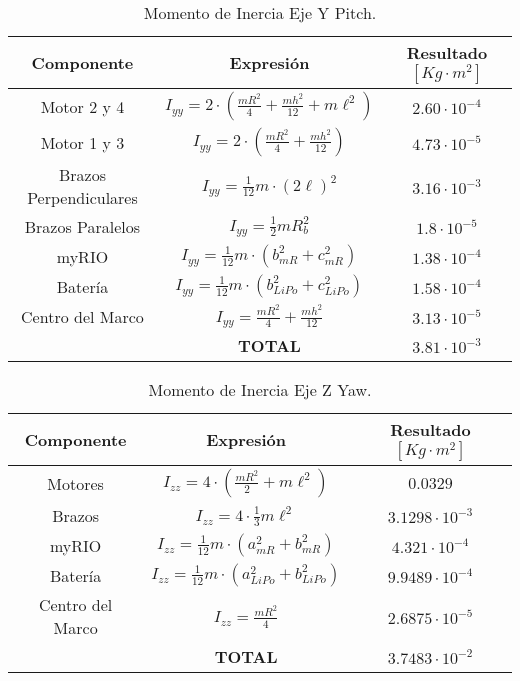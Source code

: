 \documentclass[../main.tex]{subfiles}
\begin{document}
\begin{table}[H]
\noindent \begin{centering}
\begin{tabular}{|c|c|c|}
\hline 
\textbf{Componente } & \textbf{Expresión} & \textbf{Resultado $[Kg\cdot m^2]$}\tabularnewline
\hline 
\hline 
Motor 2 y 4 & $I_{yy}=2\cdot(\frac{mR^{2}}{4}+\frac{mh^{2}}{12}+m\ell^{2})$ & $2.60\cdot10^{-4}$\tabularnewline
\hline 
Motor 1 y 3 & $I_{yy}=2\cdot(\frac{mR^{2}}{4}+\frac{mh^{2}}{12})$ & $4.73\cdot10^{-5}$\tabularnewline
\hline 
Brazos Perpendiculares & $I_{yy}=\frac{1}{12}m\cdot(2\ell)^{2}$ & $3.16\cdot10^{-3}$\tabularnewline
\hline 
Brazos Paralelos & $I_{yy}=\frac{1}{2}mR_{b}^{2}$ & $1.8\cdot10^{-5}$\tabularnewline
\hline 
myRIO & $I_{yy}=\frac{1}{12}m\cdot(b_{mR}^{2}+c_{mR}^{2})$ & $1.38\cdot10^{-4}$\tabularnewline
\hline 
Batería & $I_{yy}=\frac{1}{12}m\cdot(b_{LiPo}^{2}+c_{LiPo}^{2})$ & $1.58\cdot10^{-4}$\tabularnewline
\hline 
Centro del Marco & $I_{yy}=\frac{mR^{2}}{4}+\frac{mh^{2}}{12}$ & $3.13\cdot10^{-5}$\tabularnewline
\hline 
\multicolumn{1}{c|}{} & \textbf{TOTAL} & $3.81\cdot10^{-3}$\tabularnewline
\cline{2-3} 
\end{tabular}
\par\end{centering}
\caption{Momento de Inercia Eje Y Pitch.}
\end{table}

\begin{table}[H]
\noindent \begin{centering}
\begin{tabular}{|c|c|c|}
\hline 
\textbf{Componente } & \textbf{Expresión} & \textbf{Resultado $[Kg\cdot m^2]$}\tabularnewline
\hline 
\hline 
Motores & $I_{zz}=4\cdot(\frac{mR^{2}}{2}+m\ell^{2})$ & $0.0329$\tabularnewline
\hline 
Brazos & $I_{zz}=4\cdot\frac{1}{3}m\ell^{2}$ & $3.1298\cdot10^{-3}$\tabularnewline
\hline 
myRIO & $I_{zz}=\frac{1}{12}m\cdot(a_{mR}^{2}+b_{mR}^{2})$ & $4.321\cdot10^{-4}$\tabularnewline
\hline 
Batería & $I_{zz}=\frac{1}{12}m\cdot(a_{LiPo}^{2}+b_{LiPo}^{2})$ & $9.9489\cdot10^{-4}$\tabularnewline
\hline 
Centro del Marco & $I_{zz}=\frac{mR^{2}}{4}$ & $2.6875\cdot10^{-5}$\tabularnewline
\hline 
\multicolumn{1}{c|}{} & \textbf{TOTAL} & $3.7483\cdot10^{-2}$\tabularnewline
\cline{2-3} 
\end{tabular}
\par\end{centering}
\caption{Momento de Inercia Eje Z Yaw.}
\end{table}
\end{document}
